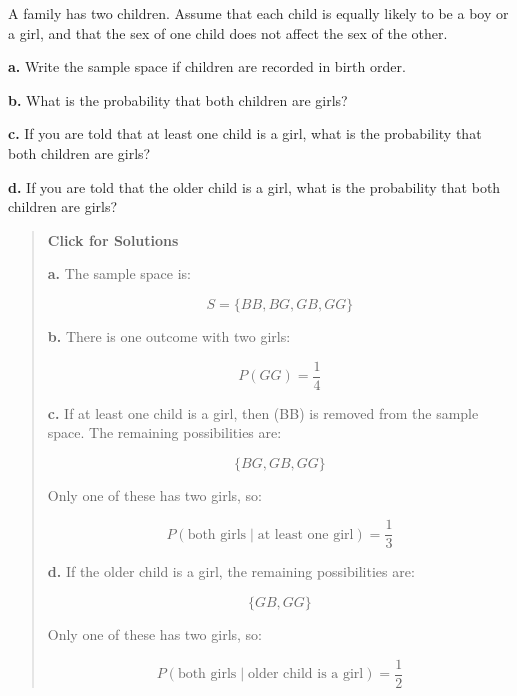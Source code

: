 \documentclass[
  letterpaper,
  DIV=11,
  numbers=noendperiod]{scrreprt}
\begin{document}
\begin{tcolorbox}[enhanced jigsaw, arc=.35mm, bottomrule=.15mm, bottomtitle=1mm, breakable, colback=white, colbacktitle=quarto-callout-note-color!10!white, colframe=quarto-callout-note-color-frame, coltitle=black, left=2mm, leftrule=.75mm, opacityback=0, opacitybacktitle=0.6, rightrule=.15mm, title=\textcolor{quarto-callout-note-color}{\faInfo}\hspace{0.5em}{Question 3}, titlerule=0mm, toprule=.15mm, toptitle=1mm]

A family has two children. Assume that each child is equally likely to
be a boy or a girl, and that the sex of one child does not affect the
sex of the other.

\textbf{a.} Write the sample space if children are recorded in birth
order.

\textbf{b.} What is the probability that both children are girls?

\textbf{c.} If you are told that at least one child is a girl, what is
the probability that both children are girls?

\textbf{d.} If you are told that the older child is a girl, what is the
probability that both children are girls?

\begin{quote}
\textbf{Click for Solutions}

\textbf{a.} The sample space is:

\[
S = \{BB,BG,GB,GG\}
\]

\textbf{b.} There is one outcome with two girls:

\[
P(GG) = \frac{1}{4}
\]

\textbf{c.} If at least one child is a girl, then (BB) is removed from
the sample space. The remaining possibilities are:

\[
\{BG,GB,GG\}
\]

Only one of these has two girls, so:

\[
P(\text{both girls} \mid \text{at least one girl}) = \frac{1}{3}
\]

\textbf{d.} If the older child is a girl, the remaining possibilities
are:

\[
\{GB,GG\}
\]

Only one of these has two girls, so:

\[
P(\text{both girls} \mid \text{older child is a girl}) = \frac{1}{2}
\]
\end{quote}

\end{tcolorbox}
\end{document}
